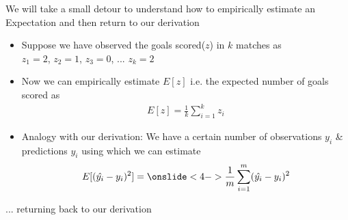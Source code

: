 				
\begin{frame}
	\begin{block}{}
		We will take a small detour to understand how to empirically estimate an Expectation and then return to our derivation
	\end{block}
\end{frame}
\begin{frame}
	\begin{itemize}
		\justifying
		\setlength\itemsep{1em}
		\item<1-> Suppose we have observed the goals scored($z$) in $k$ matches as \\$z_1=2$, $z_2=1$, $z_3=0$, ... $z_k=2$
		\item<2-> Now we can empirically estimate $E[z]$ i.e. the expected number of goals scored as\\
		\begin{align*}
			E[z]=\frac{1}{k}\sum_{i=1}^{k}z_i 
		\end{align*}
		\item<3-> Analogy with our derivation: We have a certain number of observations $y_i$ \& predictions $\hat{y_i}$ using which we can estimate\\
		\begin{align*}
			E[(\hat{y_i}-y_i)^2]= \onslide<4->{\frac{1}{m}\sum_{i=1}^{m}(\hat{y_i}-y_i)^2} 
		\end{align*}
	\end{itemize}
		
\end{frame}
\begin{frame}
	\begin{block}{}
		... returning back to our derivation
	\end{block}
\end{frame}
